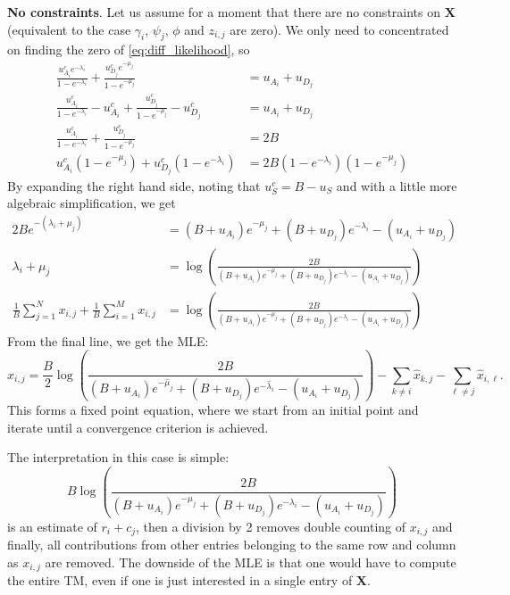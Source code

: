 \documentclass[12pt]{article}
\numberwithin{equation}{section}
\numberwithin{table}{section}
\numberwithin{figure}{section}
\newcommand{\be}{\begin{equation}}
\newcommand{\ee}{\end{equation}}
\newcommand{\ben}{\begin{equation*}}
\newcommand{\een}{\end{equation*}}
\def\bX{\mathbf{X}}
\begin{document}
\medskip
\noindent
\textbf{No constraints}. 
Let us assume for a moment that there are no constraints on $\bX$ (equivalent to the case $\gamma_i$, $\psi_j$, $\phi$ and $z_{i,j}$ are zero). 
We only need to concentrated on finding the zero of \autoref{eq:diff_likelihood}, so
\begin{align*}
\frac{u^c_{A_i} e^{-\lambda_i}}{1-e^{-\lambda_i}} + \frac{u^c_{D_j} e^{-\mu_j}}{1-e^{-\mu_j}} &= u_{A_i} + u_{D_j}\\
\frac{u^c_{A_i}}{1-e^{-\lambda_i}}  - u^c_{A_i}+ \frac{u^c_{D_j} }{1-e^{-\mu_j}} - u^c_{D_j}  &=  u_{A_i} + u_{D_j}\\
\frac{u^c_{A_i}}{1-e^{-\lambda_i}}  + \frac{u^c_{D_j} }{1-e^{-\mu_j}} &= 2B\\
u^c_{A_i} (1-e^{-\mu_j}) + u^c_{D_j} (1-e^{-\lambda_i}) &= 2B(1-e^{-\lambda_i})(1-e^{-\mu_j})
\end{align*}
By expanding the right hand side, noting that $u^c_{S} = B - u_{S}$ and with a little more algebraic simplification, we get
\begin{align*}
2B e^{-(\lambda_i + \mu_j)} &= (B+u_{A_i}) e^{-\mu_j} + (B+u_{D_j}) e^{-\lambda_i} - (u_{A_i} + u_{D_j})\\
\lambda_i + \mu_j &= \log\left( \frac{2B}{(B+u_{A_i}) e^{-\mu_j} + (B+u_{D_j}) e^{-\lambda_i} - (u_{A_i} + u_{D_j}) }\right)\\
\frac{1}{B} \sum_{j=1}^N x_{i,j} + \frac{1}{B} \sum_{i=1}^M x_{i,j} & = \log\left( \frac{2B}{(B+u_{A_i}) e^{-\mu_j} + (B+u_{D_j}) e^{-\lambda_i} - (u_
{A_i} + u_{D_j}) }\right)
\end{align*}
From the final line, we get the MLE:
\be
\hat{x}_{i,j} = \frac{B}{2} \log\left( \frac{2B}{(B+u_{A_i}) e^{-\hat{\mu}_j} + (B+u_{D_j}) e^{-\hat{\lambda}_i} - (u_{A_i} + u_{D_j}) }\right) - \sum_{k 
\ne i} \hat{x}_{k,j} - \sum_{\ell \ne j} \hat{x}_{i,\ell}.
\label{eq:mle_unconstrained}
\ee
This forms a fixed point equation, where we start from an initial point and iterate until a convergence criterion is achieved. 

The interpretation in this case is simple:
\ben
B \log\left( \frac{2B}{(B+u_{A_i}) e^{-\mu_j} + (B+u_{D_j}) e^{-\lambda_i} - (u_{A_i} + u_{D_j}) }\right)
\een
is an estimate of $r_i + c_j$, then a division by 2 removes double counting of $x_{i,j}$ and finally, all contributions from other
entries belonging to the same row and column as $x_{i,j}$ are removed. The downside of the MLE is that one would have to compute the 
entire TM, even if one is just interested in a single entry of $\bX$.
\end{document}
